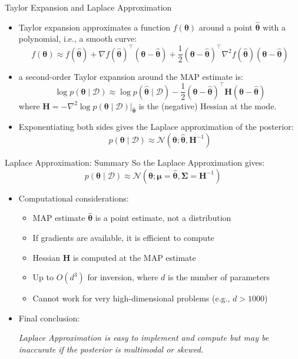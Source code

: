 \documentclass{beamer}
\begin{document}
\begin{frame}{Taylor Expansion and Laplace Approximation}
  \begin{itemize}
  \item Taylor expansion approximates a function \(f(\boldsymbol{\theta})\) around a point \(\hat{\boldsymbol{\theta}}\) with a polynomial, i.e., a smooth curve:
    \[
      f(\boldsymbol{\theta}) \approx f(\hat{\boldsymbol{\theta}}) + \nabla f(\hat{\boldsymbol{\theta}})^\top (\boldsymbol{\theta} - \hat{\boldsymbol{\theta}}) + \frac{1}{2} (\boldsymbol{\theta} - \hat{\boldsymbol{\theta}})^\top \nabla^2 f(\hat{\boldsymbol{\theta}}) (\boldsymbol{\theta} - \hat{\boldsymbol{\theta}})
    \]
  \item a second-order Taylor expansion around the MAP estimate is:
\[
\log p(\boldsymbol{\theta} \mid \mathcal{D}) \approx \log p(\hat{\boldsymbol{\theta}} \mid \mathcal{D})
- \frac{1}{2} (\boldsymbol{\theta} - \hat{\boldsymbol{\theta}})^\top \mathbf{H} (\boldsymbol{\theta} - \hat{\boldsymbol{\theta}})
\]
where \(\mathbf{H} = -\nabla^2 \log p(\boldsymbol{\theta} \mid \mathcal{D}) \big|_{\hat{\boldsymbol{\theta}}}\) is the (negative) Hessian at the mode.

\item Exponentiating both sides gives the Laplace approximation of the posterior:
\[
p(\boldsymbol{\theta} \mid \mathcal{D}) \approx \mathcal{N}(\boldsymbol{\theta}; \hat{\boldsymbol{\theta}}, \mathbf{H}^{-1})
\]
\end{itemize}
\end{frame}

\begin{frame}{Laplace Approximation: Summary}
So the Laplace Approximation gives:
\[
p(\boldsymbol{\theta} \mid \mathcal{D}) \approx \mathcal{N}(\bm{\theta}; \bm{\mu}=\hat{\bm{\theta}}, \bm{\Sigma}=\mathbf{H}^{-1})\]

\begin{itemize}
\item Computational considerations:
\begin{itemize}
\item MAP estimate \(\hat{\boldsymbol{\theta}}\) is a point estimate, not a distribution
\item If gradients are available, it is efficient to compute
\item Hessian \(\mathbf{H}\) is computed at the MAP estimate
\item Up to \(O(d^3)\) for inversion, where \(d\) is the number of parameters
  \item Cannot work for very high-dimensional problems (e.g., \(d > 1000\))
\end{itemize}
\item Final conclusion:

  \textit{Laplace Approximation is easy to implement and compute but may be inaccurate if the posterior is multimodal or skewed.}
\end{itemize}
\end{frame}
\end{document}
